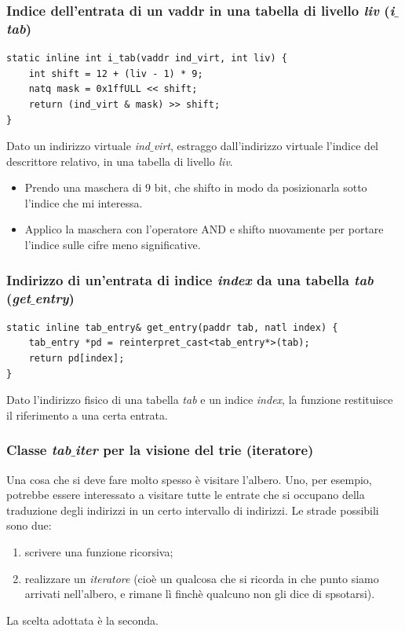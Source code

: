 \documentclass[11pt]{report}
\theoremstyle{definition}
\begin{document}
\subsubsection{Indice dell'entrata di un vaddr in una tabella di livello \emph{liv}	 (\emph{i$\_$tab})}
\small 
\begin{verbatim}
static inline int i_tab(vaddr ind_virt, int liv) {
    int shift = 12 + (liv - 1) * 9;
    natq mask = 0x1ffULL << shift;
    return (ind_virt & mask) >> shift;
}
\end{verbatim}
\normalsize 
Dato un indirizzo virtuale \emph{ind$\_$virt}, estraggo dall'indirizzo virtuale l'indice del descrittore relativo, in una tabella di livello \emph{liv}.
\begin{itemize}
	\item Prendo una maschera di $9$ bit, che shifto in modo da posizionarla sotto l'indice che mi interessa.
	\item Applico la maschera con l'operatore AND e shifto nuovamente per portare l'indice sulle cifre meno significative.
\end{itemize}

\subsubsection{Indirizzo di un'entrata di indice \emph{index} da una tabella \emph{tab} (\emph{get$\_$entry})}
\small
\begin{verbatim}
static inline tab_entry& get_entry(paddr tab, natl index) {
    tab_entry *pd = reinterpret_cast<tab_entry*>(tab);
    return pd[index];
}
\end{verbatim}
\normalsize 
Dato l'indirizzo fisico di una tabella \emph{tab} e un indice \emph{index}, la funzione restituisce il riferimento a una certa entrata.

\subsubsection{Classe \emph{tab$\_$iter} per la visione del trie (iteratore)}
Una cosa che si deve fare molto spesso è visitare l'albero. Uno, per esempio, potrebbe essere interessato a visitare tutte le entrate che si occupano della traduzione degli indirizzi in un certo intervallo di indirizzi. Le strade possibili sono due:
\begin{enumerate}
	\item scrivere una funzione ricorsiva;
	\item realizzare un \emph{iteratore} (cioè un qualcosa che si ricorda in che punto siamo arrivati nell'albero, e rimane lì finchè qualcuno non gli dice di spsotarsi).
\end{enumerate}
{La scelta adottata è la seconda}.
\end{document}
